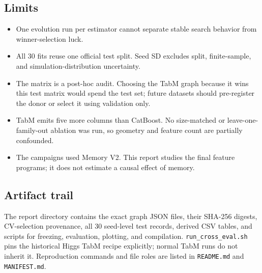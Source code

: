 \documentclass[10pt]{article}
\newcommand{\code}[1]{\texttt{#1}}
\begin{document}
\subsection{Limits}

\begin{itemize}
  \item One evolution run per estimator cannot separate stable search behavior
  from winner-selection luck.
  \item All 30 fits reuse one official test split.  Seed SD excludes split,
  finite-sample, and simulation-distribution uncertainty.
  \item The matrix is a post-hoc audit.  Choosing the TabM graph because it
  wins this test matrix would spend the test set; future datasets should
  pre-register the donor or select it using validation only.
  \item TabM emits five more columns than CatBoost.  No size-matched or
  leave-one-family-out ablation was run, so geometry and feature count are
  partially confounded.
  \item The campaigns used Memory V2.  This report studies the final feature
  programs; it does not estimate a causal effect of memory.
\end{itemize}

\subsection{Artifact trail}

The report directory contains the exact graph JSON files, their SHA-256
digests, CV-selection provenance, all 30 seed-level test records, derived CSV
tables, and scripts for freezing, evaluation, plotting, and compilation.
\code{run\_cross\_eval.sh} pins the historical Higgs TabM recipe explicitly;
normal TabM runs do not inherit it.  Reproduction commands and file roles are
listed in \code{README.md} and \code{MANIFEST.md}.
\end{document}
